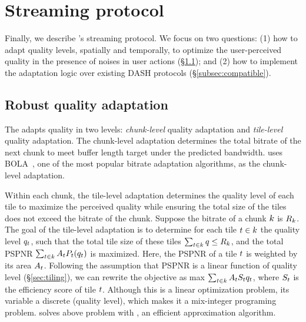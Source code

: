
\section{Streaming protocol}
\label{sec:control}


Finally, we describe \name's streaming protocol. %
We focus on two questions: 
(1) how to adapt quality levels, spatially and temporally, to optimize the user-perceived quality in the presence of noises in user actions (\S\ref{subsec:adaptation}); and
(2) how to implement the \name adaptation logic over existing DASH protocols (\S\ref{subsec:compatible}).

\subsection{Robust quality adaptation}
\label{subsec:adaptation}
The \name adapts quality in two levels: {\em chunk-level} quality adaptation and {\em tile-level} quality adaptation. 
The chunk-level adaptation determines the total bitrate of the next chunk to meet buffer length target under the predicted bandwidth.
\name uses BOLA~\cite{bola}, one of the most popular bitrate adaptation algorithms, as the chunk-level adaptation. 

Within each chunk, the tile-level adaptation determines the quality level of each tile to maximize the perceived quality while ensuring the total size of the tiles does not exceed the bitrate of the chunk. 
Suppose the bitrate of a chunk $k$ is $R_k$. The goal of the tile-level adaptation is to determine for each tile $t\in k$ the quality level $q_t$, such that the total tile size of these tiles $\sum_{t\in k}q\leq R_k$, and the total PSPNR $\sum_{t\in k}A_tP_t(q_t)$ is maximized. 
Here, the PSPNR of a tile $t$ is weighted by its area $A_t$.
Following the assumption that PSPNR is a linear function of quality level (\S\ref{sec:tiling}), we can rewrite the objective as max $\sum_{t\in k}A_tS_tq_t$, where $S_t$ is the efficiency score of tile $t$. 
Although this is a linear optimization problem, its variable a discrete (quality level), which makes it a mix-integer programing problem. 
\name solves above problem with \fillme, an efficient approximation algorithm. 

